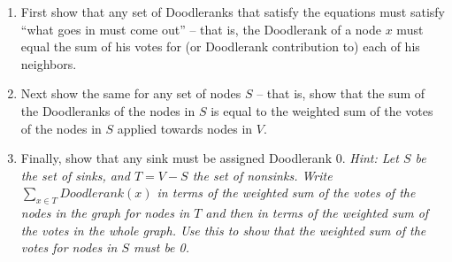 \documentclass[twoside,12pt]{article}
\begin{document}
\begin{problem}[25 points]
\begin{enumerate}
\item
First show that any set of Doodleranks that satisfy the equations
must satisfy ``what goes in must come out'' -- that is, the
Doodlerank of a node $x$ must equal the sum of his votes for (or
Doodlerank contribution to) each of his neighbors.


\item
Next show the same for any set of nodes $S$ -- that is, show that
the sum of the Doodleranks of the nodes in $S$ is equal to the
weighted sum of the votes of the nodes in $S$ applied towards nodes
in $V$.


\item
Finally, show that any sink must be assigned Doodlerank 0. {\em
Hint:  Let $S$ be the set of sinks, and $T=V-S$ the set of nonsinks.
Write $\sum_{x \in T} Doodlerank(x)$ in terms of the weighted sum of
the votes of the nodes in the graph for nodes in $T$ and then in
terms of the weighted sum of the votes in the whole graph. Use this
to show that the weighted sum of the votes for nodes in $S$ must be
0.}

\end{enumerate}
\end{problem}
\end{document}

